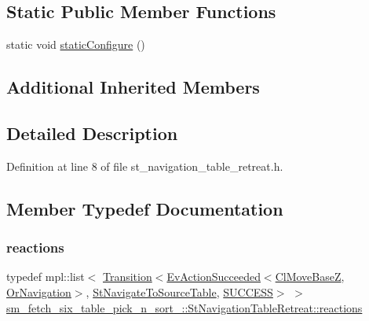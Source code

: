 \subsection*{Static Public Member Functions}
\begin{DoxyCompactItemize}
\item 
static void \hyperlink{structsm__fetch__six__table__pick__n__sort__1_1_1StNavigationTableRetreat_a744f9201796aad510626a6ceaed8597c}{static\+Configure} ()
\end{DoxyCompactItemize}
\subsection*{Additional Inherited Members}


\subsection{Detailed Description}


Definition at line 8 of file st\+\_\+navigation\+\_\+table\+\_\+retreat.\+h.



\subsection{Member Typedef Documentation}
\mbox{\label{structsm__fetch__six__table__pick__n__sort__1_1_1StNavigationTableRetreat_a012105d61d76a0da83607b5910d8f710}} 
\subsubsection{\texorpdfstring{reactions}{reactions}}
{\footnotesize\ttfamily typedef mpl\+::list$<$ \hyperlink{classsmacc_1_1Transition}{Transition}$<$\hyperlink{structsmacc_1_1default__events_1_1EvActionSucceeded}{Ev\+Action\+Succeeded}$<$\hyperlink{classcl__move__base__z_1_1ClMoveBaseZ}{Cl\+Move\+BaseZ}, \hyperlink{classsm__fetch__six__table__pick__n__sort__1_1_1OrNavigation}{Or\+Navigation}$>$, \hyperlink{structsm__fetch__six__table__pick__n__sort__1_1_1StNavigateToSourceTable}{St\+Navigate\+To\+Source\+Table}, \hyperlink{structsmacc_1_1default__transition__tags_1_1SUCCESS}{S\+U\+C\+C\+E\+SS}$>$ $>$ \hyperlink{structsm__fetch__six__table__pick__n__sort__1_1_1StNavigationTableRetreat_a012105d61d76a0da83607b5910d8f710}{sm\+\_\+fetch\+\_\+six\+\_\+table\+\_\+pick\+\_\+n\+\_\+sort\+\_\+::\+St\+Navigation\+Table\+Retreat\+::reactions}}



